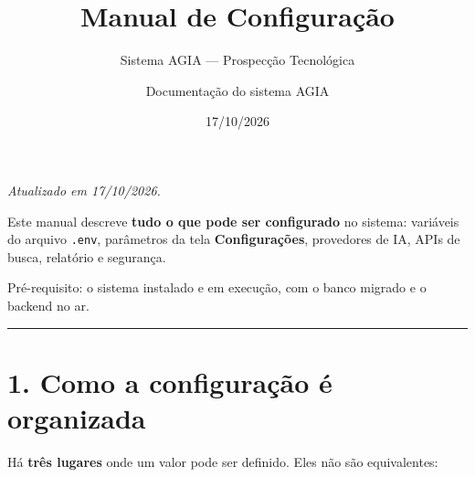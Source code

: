 \documentclass[
  brazilian,
  a4paper,12pt,oneside]{report}
\title{Manual de Configuração}
\subtitle{Sistema AGIA --- Prospecção Tecnológica}
\author{Documentação do sistema AGIA}
\date{17/10/2026}
\begin{document}
\maketitle

{
\setcounter{tocdepth}{1}
\tableofcontents
}
\emph{Atualizado em 17/10/2026.}

Este manual descreve \textbf{tudo o que pode ser configurado} no
sistema: variáveis do arquivo \texttt{.}\allowbreak{}\texttt{env},
parâmetros da tela \textbf{Configurações}, provedores de IA, APIs de
busca, relatório e segurança.

Pré-requisito: o sistema instalado e em execução, com o banco migrado e
o backend no ar.

\begin{center}\rule{0.5\linewidth}{0.5pt}\end{center}

\chapter{1. Como a configuração é
organizada}\label{como-a-configurauxe7uxe3o-uxe9-organizada}

Há \textbf{três lugares} onde um valor pode ser definido. Eles não são
equivalentes:
\end{document}
